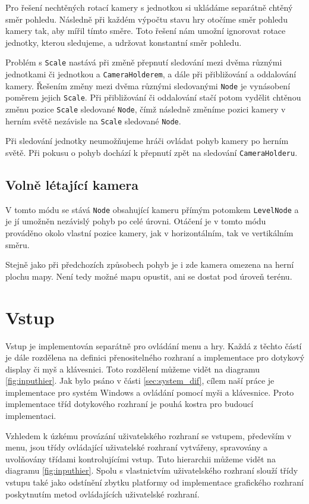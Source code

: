 Pro řešení nechtěných rotací kamery s jednotkou si ukládáme separátně chtěný směr pohledu. Následně při každém výpočtu stavu hry otočíme směr pohledu kamery tak, aby mířil tímto směre. Toto řešení nám umožní ignorovat rotace jednotky, kterou sledujeme, a udržovat konstantní směr pohledu. 

Problém s \texttt{Scale} nastává při změně přepnutí sledování mezi dvěma různými jednotkami či jednotkou a \texttt{CameraHolderem}, a dále při přibližování a oddalování kamery. Řešením změny mezi dvěma různými sledovanými \texttt{Node} je vynásobení poměrem jejich \texttt{Scale}. Při přibližování či oddalování stačí potom vydělit chtěnou změnu pozice \texttt{Scale} sledované \texttt{Node}, čímž následně změníme pozici kamery v herním světě nezávisle na \texttt{Scale} sledované \texttt{Node}.

Při sledování jednotky neumožňujeme hráči ovládat pohyb kamery po herním světě. Při pokusu o pohyb dochází k přepnutí zpět na sledování \texttt{CameraHolderu}.

\subsection{Volně létající kamera}
V tomto módu se stává \texttt{Node} obsahující kameru přímým potomkem \texttt{LevelNode} a je jí umožněn nezávislý pohyb po celé úrovni. Otáčení je v tomto módu prováděno okolo vlastní pozice kamery, jak v horizontálním, tak ve vertikálním směru. 

Stejně jako při předchozích způsobech pohyb je i zde kamera omezena na herní plochu mapy. Není tedy možné mapu opustit, ani se dostat pod úroveň terénu.

\section{Vstup}
\label{input}
Vstup je implementován separátně pro ovládání menu a hry. Každá z těchto částí je dále rozdělena na definici přenositelného rozhraní a implementace pro dotykový display či myš a klávesnici. Toto rozdělení můžeme vidět na diagramu \ref{fig:inputhier}. Jak bylo psáno v části \ref{sec:system_dif}, cílem naší práce je implementace pro systém Windows a ovládání pomocí myši a klávesnice. Proto implementace tříd dotykového rozhraní je pouhá kostra pro budoucí implementaci. 

Vzhledem k úzkému provázání uživatelského rozhraní se vstupem, především v menu, jsou třídy ovládající uživatelské rozhraní vytvářeny, spravovány a uvolňovány třídami kontrolujícími vstup. Tuto hierarchii můžeme vidět na diagramu \ref{fig:inputhier}. Spolu s vlastnictvím uživatelského rozhraní slouží třídy vstupu také jako odstínění zbytku platformy od implementace grafického rozhraní poskytnutím metod ovládajících uživatelské rozhraní. 

